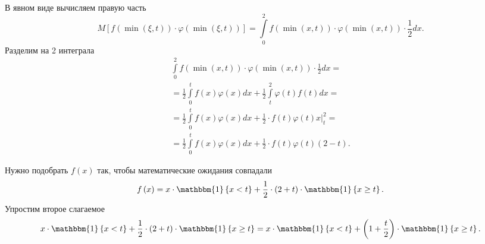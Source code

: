\begin{enumerate}[label=\alph*)]
  В явном виде вычисляем правую часть
  $$ M \left[
      f \left( \min \left( \xi, t \right) \right) \cdot
      \varphi \left( \min \left( \xi, t \right) \right)
    \right] =
    \int \limits_0^2
      f \left( \min \left( x, t \right) \right) \cdot
      \varphi \left( \min \left( x, t \right) \right) \cdot \frac{1}{2}
    dx.$$
  Разделим на 2 интеграла
  \begin{equation*}
    \begin{split}
      \int \limits_0^2
        f \left( \min \left( x, t \right) \right) \cdot
        \varphi \left( \min \left( x, t \right) \right) \cdot \frac{1}{2}
      dx = \\
      = \frac{1}{2} \int \limits_0^t f \left( x \right) \varphi \left( x \right) dx +
      \frac{1}{2} \int \limits_t^2 \varphi \left( t \right) f \left( t \right) dx = \\
      = \frac{1}{2} \int \limits_0^t f \left( x \right) \varphi \left( x \right) dx +
      \frac{1}{2} \cdot \left. f \left( t \right) \varphi \left( t \right) x \right|_t^2 = \\
      = \frac{1}{2} \int \limits_0^t f \left( x \right) \varphi \left( x \right) dx +
      \frac{1}{2} \cdot f \left( t \right) \varphi \left( t \right) \left( 2 - t \right).
    \end{split}
  \end{equation*}

  Нужно подобрать $f \left( x \right) $ так, чтобы математические ожидания совпадали
  $$f \left( x \right) =
    x \cdot \mathbbm{1} \left\{ x < t \right\} +
    \frac{1}{2} \cdot \left( 2 + t \right) \cdot \mathbbm{1} \left\{ x \geq t \right\}.$$
  Упростим второе слагаемое
  $$x \cdot \mathbbm{1} \left\{ x < t \right\} +
    \frac{1}{2} \cdot \left( 2 + t \right) \cdot \mathbbm{1} \left\{ x \geq t \right\} =
    x \cdot \mathbbm{1} \left\{ x < t \right\} +
    \left( 1 + \frac{t}{2} \right) \cdot \mathbbm{1} \left\{ x \geq t \right\}.$$


\end{enumerate}
